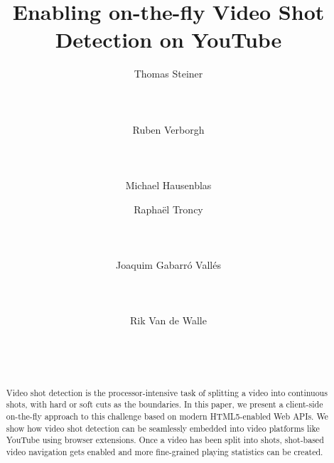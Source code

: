 \documentclass{acm_proc_article-sp}
\begin{document}
\title{Enabling on-the-fly Video Shot Detection on YouTube}

\author{
\alignauthor
Thomas Steiner\\
	\\
	\\
	\\
\alignauthor
Ruben Verborgh\\
	\\
	\\
	\\
\alignauthor	
Michael Hausenblas
\and	
\alignauthor	
Rapha\"{e}l Troncy\\
       \\
       \\
       \\
\alignauthor
Joaquim Gabarr\'o Vall\'es\\
	\\
	\\
	\\
\alignauthor
Rik Van de Walle\\
	\\
	\\
	\\
}
\maketitle
\begin{abstract}
Video shot detection is the processor-intensive task of splitting a video into continuous shots, with hard or soft cuts as the boundaries. In this paper, we present a client-side on-the-fly approach to this challenge based on modern HTML5-enabled Web APIs. We show how video shot detection can be seamlessly embedded into video platforms like YouTube using browser extensions. Once a video has been split into shots, shot-based video navigation gets enabled and more fine-grained playing statistics can be created.
\end{abstract}
\end{document}
